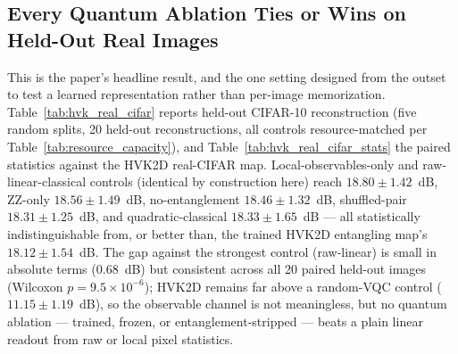 \documentclass[journal]{IEEEtran}
\begin{document}
\subsection{Every Quantum Ablation Ties or Wins on Held-Out Real Images}
\label{sec:holdout_headline}
This is the paper's headline result, and the one setting designed from the outset to test a learned representation rather than per-image memorization. Table~\ref{tab:hvk_real_cifar} reports held-out CIFAR-10 reconstruction (five random splits, 20 held-out reconstructions, all controls resource-matched per Table~\ref{tab:resource_capacity}), and Table~\ref{tab:hvk_real_cifar_stats} the paired statistics against the HVK2D real-CIFAR map. Local-observables-only and raw-linear-classical controls (identical by construction here) reach $18.80\pm1.42$~dB, ZZ-only $18.56\pm1.49$~dB, no-entanglement $18.46\pm1.32$~dB, shuffled-pair $18.31\pm1.25$~dB, and quadratic-classical $18.33\pm1.65$~dB --- all statistically indistinguishable from, or better than, the trained HVK2D entangling map's $18.12\pm1.54$~dB. The gap against the strongest control (raw-linear) is small in absolute terms ($0.68$~dB) but consistent across all 20 paired held-out images (Wilcoxon $p=9.5\times10^{-6}$); HVK2D remains far above a random-VQC control ($11.15\pm1.19$~dB), so the observable channel is not meaningless, but no quantum ablation --- trained, frozen, or entanglement-stripped --- beats a plain linear readout from raw or local pixel statistics.
\end{document}
